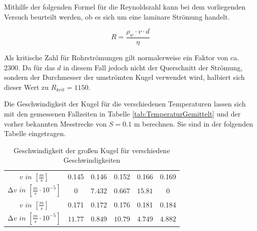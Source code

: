 Mithilfe der folgenden Formel für die Reynoldszahl kann bei dem vorliegenden Versuch beurteilt werden, ob es
sich um eine laminare Strömung handelt.

\begin{equation}
  R = \frac{ \rho_{w} \cdot v \cdot d}{\eta}
\end{equation}


Als kritische Zahl für Rohrströmungen gilt normalerweise ein Faktor von ca. 2300. Da für das $d$ in diesem
Fall jedoch nicht der Querschnitt der Strömung, sondern der Durchmesser der umströmten Kugel verwendet wird,
halbiert sich dieser Wert zu $R_{krit} = 1150$.

Die Geschwindigkeit der Kugel für die verschiedenen Temperaturen lassen sich mit den gemessenen Fallzeiten in
Tabelle \ref{tab:TemperaturGemittelt} und der vorher bekannten Messtrecke von $S = 0.1$ m berechnen. Sie sind
in der folgenden Tabelle eingetragen.

\begin{table}
  \centering
  \caption{Geschwindigkeit der großen Kugel für verschiedene Geschwindigkeiten}
  \label{tab:Geschwindigkeiten}
  \begin{tabular}{c | c c c c c }
    \toprule
    $v \,\, in \,\, \left[ \frac{m}{s} \right]$ & 0.145 & 0.146 & 0.152 & 0.166 & 0.169 \\
    $\increment v \,\, in \,\, \left[ \frac{m}{s} \cdot 10^{-5} \right]$ & $0$ & $7.432$ & $0.667$ & $15.81$ & $0$ \\
    \midrule
    $v \,\, in \,\, \left[ \frac{m}{s} \right]$ & 0.171 & 0.172 & 0.176 & 0.181 & 0.184 \\
    $\increment v \,\, in \,\, \left[ \frac{m}{s} \cdot 10^{-5} \right ]$ & $11.77$ & $0.849$ & $10.79$ & $4.749$ & $4.882$ \\
    \bottomrule
  \end{tabular}
\end{table}






